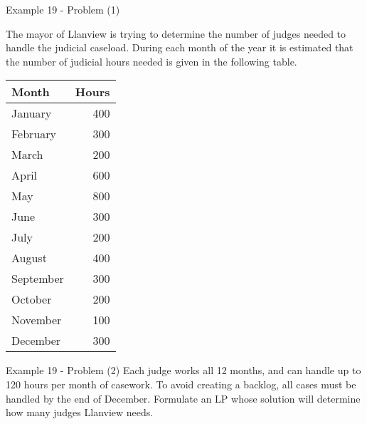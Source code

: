 \begin{frame}{Example 19 - Problem (1)}

\begin{multicols}{2}
The mayor of Llanview is trying to determine the number of judges needed to
handle the judicial caseload. During each month of the year it is estimated
that the number of judicial hours needed is given in the following table.

\begin{center}
\begin{tabular}{lr}
\hline
  \cellcolor{gray90}\textbf{Month}
& \cellcolor{gray90}\textbf{Hours} \\
\hline
January    & 400 \\
February   & 300 \\
March      & 200 \\
April      & 600 \\
May        & 800 \\
June       & 300 \\
July       & 200 \\
August     & 400 \\
September  & 300 \\
October    & 200 \\
November   & 100 \\
December   & 300 \\
\hline
\end{tabular}
\end{center}
\end{multicols}

\end{frame}

\begin{frame}{Example 19 - Problem (2)}
Each judge works all 12 months, and can handle up to 120 hours per month of
casework. To avoid creating a backlog, all cases must be handled by the end of
December. Formulate an LP whose solution will determine how many judges
Llanview needs.
\end{frame}
